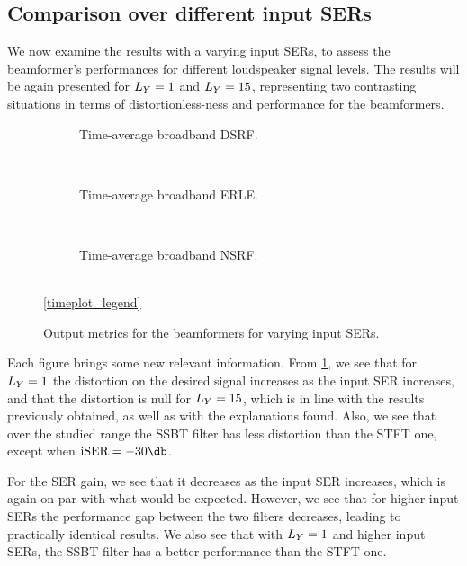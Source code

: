\subsection{Comparison over different input SERs}

We now examine the results with a varying input SERs, to assess the beamformer's performances for different loudspeaker signal levels. The results will be again presented for $\Ly = 1$ and $\Ly = 15$, representing two contrasting situations in terms of distortionless-ness and performance for the beamformers.


\begin{figure}[!t]
	\centering
	\begin{subfigure}{\textwidth}
		\centering
		
		\caption{Time-average broadband DSRF.}
		\label{subfig:lineplot__DSRF__iSER_var__err_0}
	\end{subfigure}\\[1em]
	\begin{subfigure}{\textwidth}
		\centering
		
		\caption{Time-average broadband ERLE.}
		\label{subfig:lineplot__gSER__iSER_var__err_0}
	\end{subfigure}\\[1em]
	\begin{subfigure}{\textwidth}
		\centering
		
		\caption{Time-average broadband NSRF.}
		\label{subfig:lineplot__gSNR__iSER_var__err_0}
	\end{subfigure}\\[1em]
	\ref*{timeplot_legend}
	\caption{Output metrics for the beamformers for varying input SERs.}
	\label{fig:lineplot__iSER_var__Ly_1__err_0}
\end{figure}

Each figure brings some new relevant information. From \cref{subfig:lineplot__DSRF__iSER_var__err_0}, we see that for $\Ly = 1$ the distortion on the desired signal increases as the input SER increases, and that the distortion is null for $\Ly = 15$, which is in line with the results previously obtained, as well as with the explanations found. Also, we see that over the studied range the SSBT filter has less distortion than the STFT one, except when $\iser = -30\dB$.

For the SER gain, we see that it decreases as the input SER increases, which is again on par with what would be expected. However, we see that for higher input SERs the performance gap between the two filters decreases, leading to practically identical results. We also see that with $\Ly = 1$ and higher input SERs, the SSBT filter has a better performance than the STFT one.

